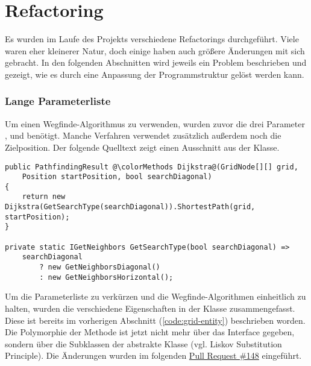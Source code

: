 \part{Refactoring}
Es wurden im Laufe des Projekts verschiedene Refactorings durchgeführt.
Viele waren eher kleinerer Natur, doch einige haben auch größere Änderungen
mit sich gebracht.
In den folgenden Abschnitten wird jeweils ein Problem beschrieben und
gezeigt, wie es durch eine Anpassung der Programmstruktur gelöst werden kann.

\section{Lange Parameterliste}
Um einen Wegfinde-Algorithmus zu verwenden, wurden zuvor die
drei Parameter ,  und
 benötigt. Manche Verfahren verwendet zusätzlich außerdem
noch die Zielposition. Der folgende Quelltext zeigt einen Ausschnitt aus der
 Klasse.
\begin{lstlisting}[caption={Die alte Verwendung der Wegfinde-Klassen},label={code:use-pathfinding}]
public PathfindingResult @\colorMethods Dijkstra@(GridNode[][] grid,
    Position startPosition, bool searchDiagonal)
{
    return new Dijkstra(GetSearchType(searchDiagonal)).ShortestPath(grid, startPosition);
}

private static IGetNeighbors GetSearchType(bool searchDiagonal) =>
    searchDiagonal
        ? new GetNeighborsDiagonal()
        : new GetNeighborsHorizontal();
\end{lstlisting}
Um die Parameterliste zu verkürzen und die Wegfinde-Algorithmen
einheitlich zu halten, wurden die verschiedene Eigenschaften in der Klasse
 zusammengefasst.
Diese ist bereits im vorherigen Abschnitt (\ref{code:grid-entity}) beschrieben worden.
Die Polymorphie der  Methode
ist jetzt nicht mehr über das Interface 
gegeben, sondern über die Subklassen der abstrakte Klasse
 (vgl. Liskov Substitution Principle).
Die Änderungen wurden im folgenden
\href{https://github.com/JensDll/pathfinding-visualization/pull/148}{Pull Request \#148}
eingeführt.

